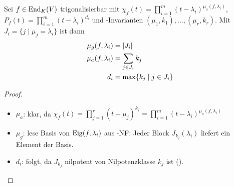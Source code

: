 \begin{conclusion}
	Sei $f\in\operatorname{End}_K(V)$ trigonalisierbar mit $\chi_f(t)=\prod_{i=1}^m (t-\lambda_i)^{\mu_a(f,\lambda_i)}$, $P_f(t)=\prod_{i=1}^m (t-\lambda_i)^{d_i}$ und -Invarianten $(\mu_1,k_1),...,(\mu_r,k_r)$. Mit $J_i=\{j\mid \mu_j=\lambda_i\}$ ist dann 
	\begin{align}
		\mu_g(f,\lambda_i)&= \vert J_i \vert \notag \\
		\mu_a(f,\lambda_i) &= \sum_{j\in J_i} k_j\notag \\
		d_i&= \max\{k_j\mid j\in J_i\}\notag
	\end{align}
\end{conclusion}
\begin{proof}
	\begin{itemize}
		\item $\mu_a$: klar, da $\chi_f(t)=\prod_{j=1}^r (t-\mu_j)^{k_j}=\prod_{i=1}^m (t-\lambda_i)^{\mu_a(f,\lambda_i)}$
		\item $\mu_g$: lese Basis von $\operatorname{Eig}(f,\lambda_i)$ aus -NF: Jeder Block $J_{k_j}(\lambda_i)$ liefert ein Element der Basis.
		\item $d_i$: folgt, da $J_{k_j}$ nilpotent von Nilpotenzklasse $k_j$ ist ().
	\end{itemize}
\end{proof}